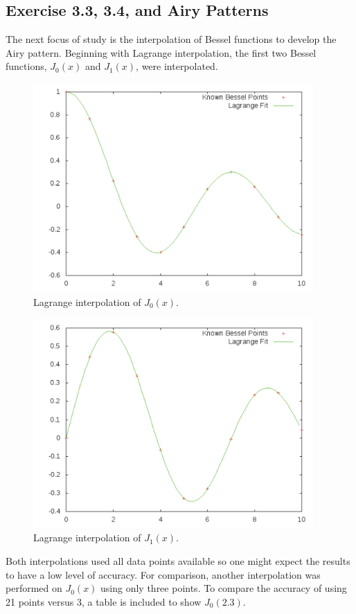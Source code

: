 \documentclass[12pt]{article}
\begin{document}
\subsection{Exercise 3.3, 3.4, and Airy Patterns}
The next focus of study is the interpolation of Bessel functions to develop the Airy pattern.  Beginning with Lagrange interpolation, the first two Bessel functions, $J_0(x)$ and $J_1(x)$, were interpolated.
\begin{figure}[!h]
\centering
\includegraphics[width =120 mm, height = 80mm]{Ex_3_3_j0.pdf}
\caption{Lagrange interpolation of $J_0(x)$.}
\label{fig:3.3.j0}
\end{figure}
\begin{figure}[!h]
\centering
\includegraphics[width =120 mm, height = 80mm]{Ex_3_3_j1.pdf}
\caption{Lagrange interpolation of $J_1(x)$.}
\label{fig:3.3.j1}
\end{figure}
Both interpolations used all data points available so one might expect the results to have a low level of accuracy.  For comparison, another interpolation was performed on $J_0(x)$ using only three points.  To compare the accuracy of using 21 points versus 3, a table is included to show $J_0(2.3)$.
\end{document}
